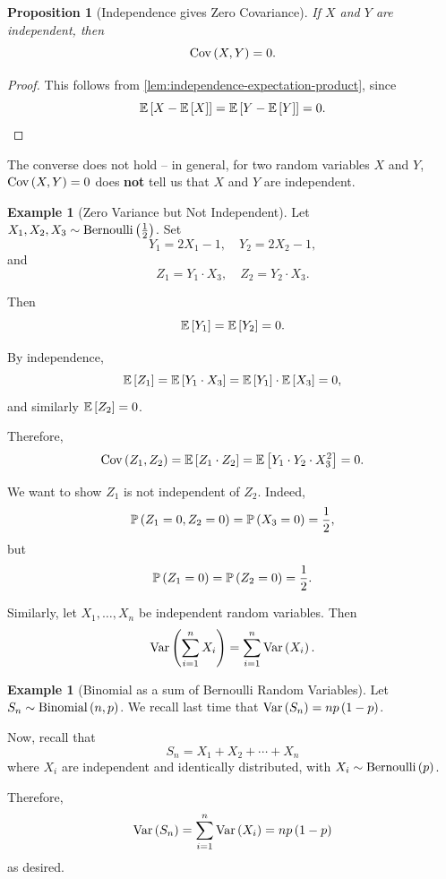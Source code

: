 \documentclass{article}
\newtheorem{proposition}[theorem]{Proposition}
\theoremstyle{definition}
\newtheorem{example}[theorem]{Example}
\theoremstyle{remark}
\newcommand{\Prob}{\mathbb{P}}
\newcommand{\Expt}{\mathbb{E}}
\newcommand{\Var}{\operatorname{Var}}
\newcommand{\Cov}{\operatorname{Cov}}
\newcommand{\Bernoulli}{\operatorname{Bernoulli}}
\newcommand{\Binomial}{\operatorname{Binomial}}
\begin{document}
\begin{proposition}[Independence gives Zero Covariance]
    If \(X\) and \(Y\) are independent, then
    \[
        \Cov\pqty{X, Y} = 0.
    \]
\end{proposition}

\begin{proof}
    This follows from \autoref{lem:independence-expectation-product}, since
    \[
        \Expt\bqty{X - \Expt\bqty{X}} = \Expt\bqty{Y - \Expt\bqty{Y}} = 0.
    \]
\end{proof}

The converse does not hold -- in general, for two random variables \(X\) and \(Y\), \(\Cov\pqty{X, Y} = 0\) does \textbf{not} tell us that \(X\) and \(Y\) are independent.

\begin{example}[Zero Variance but Not Independent]
    \label{ex:zero-variance-no-independent}%
    Let \(X_1, X_2, X_3 \sim \Bernoulli\pqty{\frac{1}{2}}\). Set
    \[
        Y_1 = 2 X_1 - 1, \quad Y_2 = 2 X_2 - 1,
    \]
    and
    \[
        Z_1 = Y_1 \cdot X_3, \quad Z_2 = Y_2 \cdot X_3.
    \]

    Then
    \[
        \Expt\bqty{Y_1} = \Expt\bqty{Y_2} = 0.
    \]

    By independence,
    \[
        \Expt\bqty{Z_1} = \Expt\bqty{Y_1 \cdot X_3} = \Expt\bqty{Y_1} \cdot \Expt\bqty{X_3} = 0,
    \]
    and similarly \(\Expt\bqty{Z_2} = 0\).

    Therefore,
    \[
        \Cov\pqty{Z_1, Z_2} = \Expt\bqty{Z_1 \cdot Z_2} = \Expt\bqty{Y_1 \cdot Y_2 \cdot X_3^2} = 0.
    \]

    We want to show \(Z_1\) is not independent of \(Z_2\). Indeed,
    \[
        \Prob\pqty{Z_1 = 0, Z_2 = 0} = \Prob\pqty{X_3 = 0} = \frac{1}{2},
    \]
    but
    \[
        \Prob\pqty{Z_1 = 0} = \Prob\pqty{Z_2 = 0} = \frac{1}{2}.
    \]
\end{example}

Similarly, let \(X_1, \ldots, X_n\) be independent random variables. Then
\[
    \Var\pqty{\sum_{i = 1}^{n} X_i} = \sum_{i = 1}^{n} \Var\pqty{X_i}.
\]

\begin{example}[Binomial as a sum of Bernoulli Random Variables]
    \label{ex:binomial-sum-bernoulli}%
    Let \(S_n \sim \Binomial\pqty{n, p}\). We recall last time that \(\Var\pqty{S_n} = n p \pqty{1 - p}\).

    Now, recall that
    \[
        S_n = X_1 + X_2 + \cdots + X_n
    \]
    where \(X_i\) are independent and identically distributed, with \(X_i \sim \Bernoulli\pqty{p}\).

    Therefore,
    \[
        \Var\pqty{S_n} = \sum_{i = 1}^{n} \Var\pqty{X_i} = np \pqty{1 - p}
    \]
    as desired.
\end{example}
\end{document}
